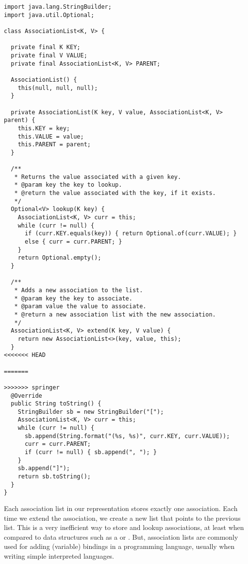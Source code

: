 \newpage %
\begin{lstlisting}[language=MyJava]
import java.lang.StringBuilder;
import java.util.Optional;

class AssociationList<K, V> {
  
  private final K KEY;
  private final V VALUE;
  private final AssociationList<K, V> PARENT;
  
  AssociationList() {
    this(null, null, null);
  }

  private AssociationList(K key, V value, AssociationList<K, V> parent) {
    this.KEY = key;
    this.VALUE = value;
    this.PARENT = parent;
  }
  
  /**
   * Returns the value associated with a given key.
   * @param key the key to lookup.
   * @return the value associated with the key, if it exists.
   */
  Optional<V> lookup(K key) {
    AssociationList<K, V> curr = this;
    while (curr != null) {
      if (curr.KEY.equals(key)) { return Optional.of(curr.VALUE); } 
      else { curr = curr.PARENT; }
    }
    return Optional.empty();
  }
  
  /**
   * Adds a new association to the list.
   * @param key the key to associate.
   * @param value the value to associate.
   * @return a new association list with the new association.
   */
  AssociationList<K, V> extend(K key, V value) {
    return new AssociationList<>(key, value, this);
  }
<<<<<<< HEAD
  
=======

>>>>>>> springer
  @Override
  public String toString() {
    StringBuilder sb = new StringBuilder("[");
    AssociationList<K, V> curr = this;
    while (curr != null) {
      sb.append(String.format("(%s, %s)", curr.KEY, curr.VALUE));
      curr = curr.PARENT;
      if (curr != null) { sb.append(", "); }
    }
    sb.append("]");
    return sb.toString();
  }
}
\end{lstlisting}

\newpage
Each association list in our representation stores exactly one association. 
Each time we extend the association, we create a new list that points to the previous list. 
This is a very inefficient way to store and lookup associations, at least when compared to data structures such as a  or . But, association lists are commonly used for adding (variable) bindings in a programming language, usually when writing simple interpreted languages.


